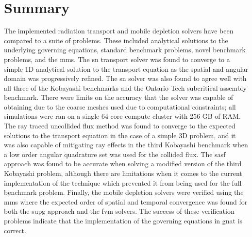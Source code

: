 \section{Summary}
\label{verification:summary}
The implemented radiation transport and mobile depletion solvers have been compared to a suite of problems. These included analytical solutions to the underlying governing equations, standard benchmark problems, novel benchmark problems, and the \acrshort{mms}. The \acrshort{sn} transport solver was found to converge to a simple 1D analytical solution to the transport equation as the spatial and angular domain was progressively refined. The \acrshort{sn} solver was also found to agree well with all three of the Kobayashi benchmarks and the Ontario Tech subcritical assembly benchmark. There were limits on the accuracy that the solver was capable of obtaining due to the coarse meshes used due to computational constraints; all simulations were ran on a single 64 core compute cluster with 256 GB of RAM. The ray traced uncollided flux method was found to converge to the expected solutions to the transport equation in the case of a simple 3D problem, and it was also capable of mitigating ray effects in the third Kobayashi benchmark when a low order angular quadrature set was used for the collided flux. The \acrshort{sasf} approach was found to be accurate when solving a modified version of the third Kobayashi problem, although there are limitations when it comes to the current implementation of the technique which prevented it from being used for the full benchmark problem. Finally, the mobile depletion solvers were verified using the \acrshort{mms} where the expected order of spatial and temporal convergence was found for both the \acrshort{supg} approach and the \acrshort{fvm} solvers. The success of these verification problems indicate that the implementation of the governing equations in \acrshort{gnat} is correct.